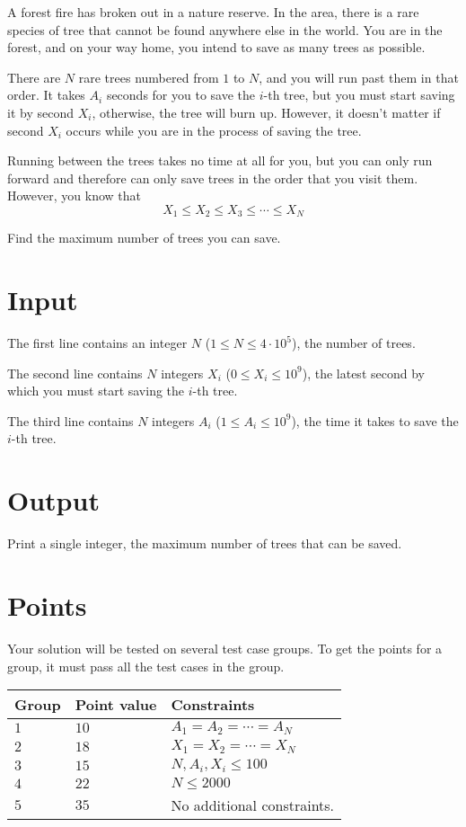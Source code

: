 \noindent
A forest fire has broken out in a nature reserve. In the area, there is a rare species of tree that cannot be found anywhere else in the world. You are in the forest, and on your way home, you intend to save as many trees as possible.

There are $N$ rare trees numbered from $1$ to $N$, and you will run past them in that order.
It takes $A_i$ seconds for you to save the $i$-th tree, but you must start saving it by second $X_i$, otherwise, the tree will burn up. However, it doesn't matter if second $X_i$ occurs while you are in the process of saving the tree.

Running between the trees takes no time at all for you, but you can only run forward and therefore can only save trees in the order that you visit them. However, you know that
$$X_1 \leq X_2 \leq X_3 \leq \cdots \leq X_N$$

Find the maximum number of trees you can save.

\section*{Input}
The first line contains an integer $N$ ($1 \leq N \leq 4 \cdot 10^5$), the number of trees.

The second line contains $N$ integers $X_i$ ($0 \leq X_i \leq 10^9$), the latest second by which you must start saving the $i$-th tree.

The third line contains $N$ integers $A_i$ ($1 \leq A_i \leq 10^9$), the time it takes to save the $i$-th tree.

\section*{Output}
Print a single integer, the maximum number of trees that can be saved.

\section*{Points}
Your solution will be tested on several test case groups.
To get the points for a group, it must pass all the test cases in the group.

\noindent
\begin{tabular}{| l | l | l |}
  \hline
  \textbf{Group} & \textbf{Point value} & \textbf{Constraints} \\ \hline
  $1$   & $10$       & $A_1 = A_2 = \cdots = A_N$\\ \hline
  $2$   & $18$       & $X_1 = X_2 = \cdots = X_N$  \\ \hline
  $3$   & $15$       & $N, A_i, X_i \leq 100$ \\ \hline
  $4$   & $22$       & $N \leq 2000$ \\ \hline
  $5$   & $35$       &  No additional constraints. \\ \hline
\end{tabular}
